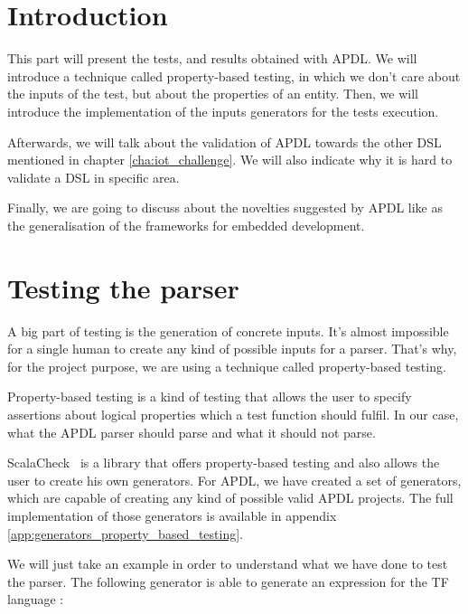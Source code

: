 
\section{Introduction}
\label{sec:validation_intro}

This part will present the tests, and results obtained with \gls{APDL}. We will
introduce a technique called property-based testing, in which we don't care
about the inputs of the test, but about the properties of an entity. Then, we
will introduce the implementation of the inputs generators for the tests
execution.

Afterwards, we will talk about the validation of \gls{APDL} towards the other
\gls{DSL} mentioned in chapter \ref{cha:iot_challenge}. We will also indicate why
it is hard to validate a \gls{DSL} in specific area.

Finally, we are going to discuss about the novelties suggested by \gls{APDL} like
as the generalisation of the frameworks for embedded development.

\section{Testing the parser}
\label{sec:testing_the_parser}

A big part of testing is the generation of concrete inputs. It's almost
impossible for a single human to create any kind of possible inputs for a parser.
That's why, for the project purpose, we are using a technique called
property-based testing.

Property-based testing is a kind of testing that allows the user to specify
assertions about logical properties which a test function should fulfil. In our case,
what the \gls{APDL} parser should parse and what it should not parse.

ScalaCheck~\cite{RickardNilsson} is a library that offers property-based testing
and also allows the user to create his own generators. For \gls{APDL}, we have
created a set of generators, which are capable of creating any kind of possible
valid \gls{APDL} projects. The full implementation of those generators is
available in appendix \ref{app:generators_property_based_testing}.

We will just take an example in order to understand what we have done to test
the parser. The following generator is able to generate an expression for the
\gls{TF} language :

